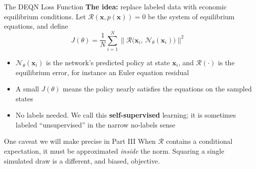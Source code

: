 \documentclass[aspectratio=169,11pt]{beamer}
\newcommand{\emphc}[1]{\textcolor{harvardcrimson}{#1}}
\newcommand{\x}{\bm{x}}
\newcommand{\param}{\theta}          %
\newcommand{\state}{\bm{x}}          %
\newcommand{\resid}{\mathcal{R}}     %
\newcommand{\net}{\mathcal{N}_{\param}} %
\begin{document}
\begin{frame}{The DEQN Loss Function}
\textbf{The idea:} replace labeled data with \emphc{economic equilibrium conditions}. Let $\resid(\state, p(\state)) = 0$ be the system of equilibrium equations, and define
\[
\boxed{
J(\param) = \frac{1}{N} \sum_{i=1}^{N} \bigl\| \resid\bigl(\state_i,\, \net(\state_i)\bigr) \bigr\|^2
}
\]

\begin{itemize}\itemsep1pt
    \item $\net(\state_i)$ is the network's \emphc{predicted policy} at state $\state_i$, and $\resid(\cdot)$ is the \emphc{equilibrium error}, for instance an Euler equation residual
    \item A small $J(\param)$ means the policy nearly satisfies the equations on the sampled states
    \item \emphc{No labels needed}. We call this \textbf{self-supervised} learning; it is sometimes labeled ``unsupervised'' in the narrow no-labels sense
\end{itemize}

\vspace{0.2em}
\begin{alertblock}{One caveat we will make precise in Part III}
\footnotesize
When $\resid$ contains a conditional expectation, it must be approximated \emph{inside} the norm. Squaring a single simulated draw is a different, and biased, objective.
\end{alertblock}
\end{frame}
\end{document}
